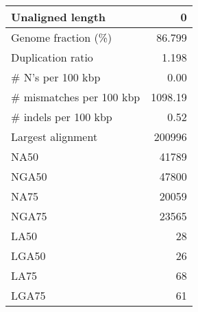\documentclass[12pt,a4paper]{article}
\begin{document}
\begin{table}[ht]
\begin{center}
\begin{tabular}{|l*{1}{|r}|}
Unaligned length & 0 \\ \hline
Genome fraction (\%) & 86.799 \\ \hline
Duplication ratio & 1.198 \\ \hline
\# N's per 100 kbp & 0.00 \\ \hline
\# mismatches per 100 kbp & 1098.19 \\ \hline
\# indels per 100 kbp & 0.52 \\ \hline
Largest alignment & 200996 \\ \hline
NA50 & 41789 \\ \hline
NGA50 & 47800 \\ \hline
NA75 & 20059 \\ \hline
NGA75 & 23565 \\ \hline
LA50 & 28 \\ \hline
LGA50 & 26 \\ \hline
LA75 & 68 \\ \hline
LGA75 & 61 \\ \hline
\end{tabular}
\end{center}
\end{table}
\end{document}
